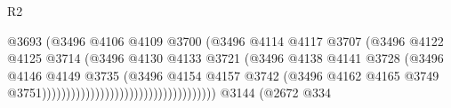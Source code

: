 \begin{lexlean}{R2}
\begin{coremodule}
                                                            @3693
                                                            (@3496
                                                              @4106
                                                              @4109
                                                              @3700
                                                              (@3496
                                                                @4114
                                                                @4117
                                                                @3707
                                                                (@3496
                                                                  @4122
                                                                  @4125
                                                                  @3714
                                                                  (@3496
                                                                    @4130
                                                                    @4133
                                                                    @3721
                                                                    (@3496
                                                                      @4138
                                                                      @4141
                                                                      @3728
                                                                      (@3496
                                                                        @4146
                                                                        @4149
                                                                        @3735
                                                                        (@3496
                                                                          @4154
                                                                          @4157
                                                                          @3742
                                                                          (@3496
                                                                            @4162
                                                                            @4165
                                                                            @3749
                                                                            @3751))))))))))))))))))))))))))))))))))))
    @3144
    (@2672
      @334

\end{coremodule}
\end{lexlean}
